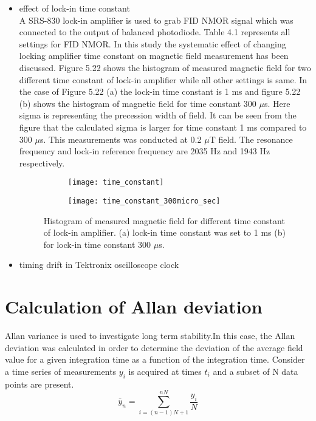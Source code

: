 \documentclass[12pt]{report}
\begin{document}
   \begin{itemize}
   \item effect of lock-in time constant\\
  A SRS-830 lock-in amplifier is used to grab FID NMOR signal which was connected to the output of balanced photodiode. Table 4.1 represents all settings for FID NMOR. In this study the systematic effect of changing locking amplifier time constant on magnetic field measurement has been discussed. Figure 5.22  shows the histogram of measured magnetic field for two different time constant of lock-in amplifier while all other settings is same. In the case of Figure 5.22 (a) the lock-in time constant is 1 ms and figure 5.22 (b) shows the histogram of magnetic field for time constant 300 $\mu$s. Here sigma is representing the precession width of field. It can be seen from the figure that the calculated sigma is larger for time constant 1 ms compared to 300 $\mu$s. This measurements was conducted at 0.2 $\mu$T field. The resonance frequency and lock-in reference frequency are 2035 Hz and 1943 Hz respectively.
   \begin{figure}
    \centering
    \begin{subfigure}[b]{0.4\textwidth}
        \centering
        \texttt{[image: time\_constant]}
        \caption{}
        \label{fig:three sin x}
    \end{subfigure}
    \hfill
    \begin{subfigure}[b]{0.4\textwidth}
        \centering
        \texttt{[image: time\_constant\_300micro\_sec]}
        \caption{}
        \label{fig:five over x}
    \end{subfigure}
    \caption{Histogram of measured magnetic field for different time constant of lock-in amplifier. (a) lock-in time constant was set to 1 ms (b) for lock-in time constant 300 $\mu$s. }
\end{figure}
    \item timing drift in Tektronix oscilloscope clock
   \end{itemize}
   \newpage
   \section{Calculation of Allan deviation} 
   Allan variance is used to investigate long term stability.In this case, the Allan deviation was calculated in order to determine the deviation of the average field value for a given integration time as a function of the integration time\cite{doe:website2}. Consider a time series of measurements $y_i$ is acquired at times $t_i$ and  a subset of N data points are present.
 \begin{equation}
 \bar{y}_{n}= \sum_{i=(n-1)N+1}^{nN} \frac{y_i}{N} 
 \end{equation}
\end{document}
